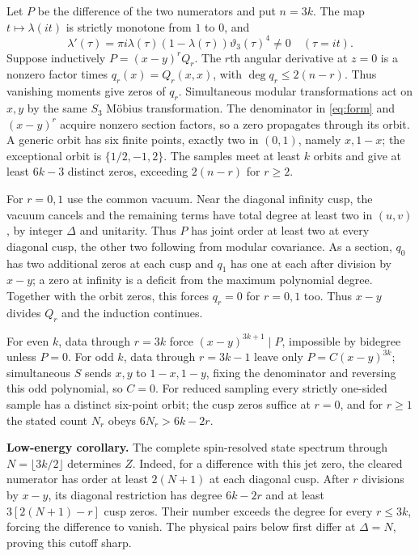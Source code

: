\documentclass[aps,prl,reprint,10pt,longbibliography]{revtex4-2}
\begin{document}
Let $P$ be the difference of the two numerators and put $n=3k$.
The map $t\mapsto\lambda(it)$ is strictly monotone from $1$ to $0$, and
\begin{equation}
 \lambda'(\tau)=\pi i\lambda(\tau)(1-\lambda(\tau))
 \vartheta_3(\tau)^4\ne0\quad(\tau=it).
 \label{eq:lambda}
\end{equation}
Suppose inductively $P=(x-y)^rQ_r$. The $r$th angular derivative at
$z=0$ is a nonzero factor times $q_r(x)=Q_r(x,x)$, with
$\deg q_r\le2(n-r)$. Thus vanishing moments give zeros of $q_r$.
Simultaneous modular transformations act on $x,y$ by the same $S_3$
M\"obius transformation. The denominator in \eqref{eq:form} and
$(x-y)^r$ acquire nonzero section factors, so a zero propagates through
its orbit. A generic orbit has six finite points, exactly two in
$(0,1)$, namely $x,1-x$; the exceptional orbit is $\{1/2,-1,2\}$.
The samples meet at least $k$ orbits and give at least $6k-3$ distinct
zeros, exceeding $2(n-r)$ for $r\ge2$.

For $r=0,1$ use the common vacuum. Near the diagonal infinity cusp,
the vacuum cancels and the remaining terms have total degree at least
two in $(u,v)$, by integer $\Delta$ and unitarity. Thus $P$ has joint
order at least two at every diagonal cusp, the other two following
from modular covariance. As a section, $q_0$ has two additional zeros
at each cusp and $q_1$ has one at each after division by $x-y$; a zero
at infinity is a deficit from the maximum polynomial degree. Together
with the orbit zeros, this forces $q_r=0$ for $r=0,1$ too. Thus
$x-y$ divides $Q_r$ and the induction continues.

For even $k$, data through $r=3k$ force $(x-y)^{3k+1}\mid P$,
impossible by bidegree unless $P=0$. For odd $k$, data through
$r=3k-1$ leave only $P=C(x-y)^{3k}$; simultaneous $S$ sends $x,y$ to
$1-x,1-y$, fixing the denominator and reversing this odd polynomial,
so $C=0$. For reduced sampling every strictly one-sided sample has a
distinct six-point orbit; the cusp zeros suffice at $r=0$, and for
$r\ge1$ the stated count $N_r$ obeys $6N_r>6k-2r$.

\noindent\textbf{Low-energy corollary.}
The complete spin-resolved state spectrum through
$N=\lfloor3k/2\rfloor$ determines $Z$. Indeed, for a difference with
this jet zero, the cleared numerator has order at least $2(N+1)$ at
each diagonal cusp. After $r$ divisions by $x-y$, its diagonal
restriction has degree $6k-2r$ and at least
$3[2(N+1)-r]$ cusp zeros. Their number exceeds the degree for every
$r\le3k$, forcing the difference to vanish. The physical pairs below
first differ at $\Delta=N$, proving this cutoff sharp.
\end{document}
